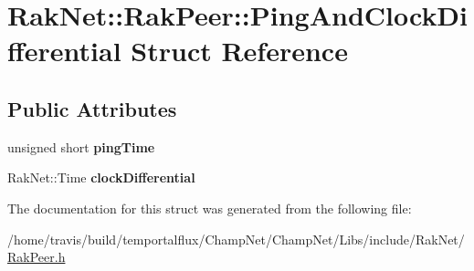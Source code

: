\hypertarget{struct_rak_net_1_1_rak_peer_1_1_ping_and_clock_differential}{\section{Rak\-Net\-:\-:Rak\-Peer\-:\-:Ping\-And\-Clock\-Differential Struct Reference}
\label{struct_rak_net_1_1_rak_peer_1_1_ping_and_clock_differential}
}
\subsection*{Public Attributes}
\begin{DoxyCompactItemize}
\item 
\hypertarget{struct_rak_net_1_1_rak_peer_1_1_ping_and_clock_differential_a0e28c6f91ca30615beaf5a9016e8f5a4}{unsigned short {\bfseries ping\-Time}}\label{struct_rak_net_1_1_rak_peer_1_1_ping_and_clock_differential_a0e28c6f91ca30615beaf5a9016e8f5a4}

\item 
\hypertarget{struct_rak_net_1_1_rak_peer_1_1_ping_and_clock_differential_adc514420889f0349d4b66e8aa3530095}{Rak\-Net\-::\-Time {\bfseries clock\-Differential}}\label{struct_rak_net_1_1_rak_peer_1_1_ping_and_clock_differential_adc514420889f0349d4b66e8aa3530095}

\end{DoxyCompactItemize}


The documentation for this struct was generated from the following file\-:\begin{DoxyCompactItemize}
\item 
/home/travis/build/temportalflux/\-Champ\-Net/\-Champ\-Net/\-Libs/include/\-Rak\-Net/\hyperlink{_rak_peer_8h}{Rak\-Peer.\-h}\end{DoxyCompactItemize}
